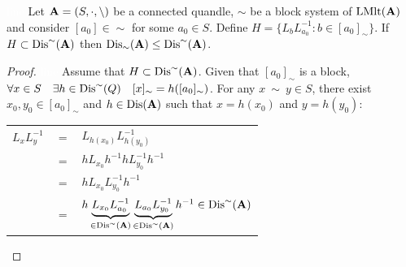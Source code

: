 \begin{lemma}\label{subsetlemma}\textcolor{white}{line}\newline
Let $\mathbf{A} = (S, \cdot, \backslash)$ be a connected quandle, $\sim$ be a block system of $\operatorname{LMlt}(\mathbf{A})$ and consider $[a_0]\in \sim$ for some $a_0\in S$. \newline Define $H = \{L_bL_{a_0}^{-1} : b \in [a_0]_\sim\}$. If $H \subset \operatorname{Dis}^\sim(\mathbf{A})$ then $\operatorname{Dis}_\sim(\mathbf{A}) \leq \operatorname{Dis}^\sim(\mathbf{A})$.
\begin{proof}\textcolor{white}{line}\newline
Assume that $H \subset \operatorname{Dis}^\sim(\mathbf{A})$.\newline
Given that $[a_0]_\sim$ is a block, $\forall x \in S\quad \exists h\in \operatorname{Dis}^\sim(Q)\quad [x]_\sim = h([a_0]_\sim)$.\newline
For any $x~\sim~y\in S$, there exist $x_0,y_0\in [a_0]_\sim$ and $h\in \operatorname{Dis}(\mathbf{A})$ such that $x=h(x_0)$ and $y=h(y_0)$:
\begin{center}
    \begin{tabular}{ccl}
        $L_xL_y^{-1}$ & $=$ & $L_{h(x_0)}L_{h(y_0)}^{-1}$\\
         & $=$ & $hL_{x_0}h^{-1}hL_{y_0}^{-1}h^{-1}$\\
         & $=$ & $hL_{x_0}L_{y_0}^{-1}h^{-1}$\\
         & $=$ & $h\underbrace{L_{x_0}L_{a_0}^{-1}}_{\in \operatorname{Dis}^\sim(\mathbf{A})}\underbrace{L_{a_0}L_{y_0}^{-1}}_{ \in \operatorname{Dis}^\sim(\mathbf{A})}h^{-1} \in \operatorname{Dis}^\sim(\mathbf{A})$\\
    \end{tabular}
\end{center}
\end{proof}
\end{lemma}

